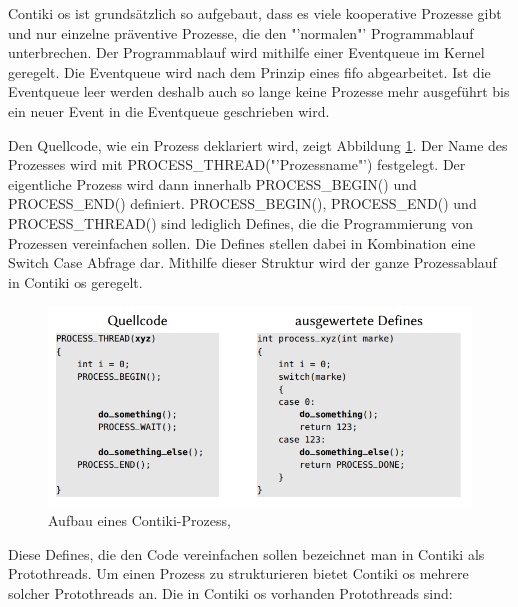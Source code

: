 	Contiki \ac{os} ist grundsätzlich so aufgebaut, dass es viele kooperative Prozesse gibt und nur einzelne präventive Prozesse, die den "'normalen"' Programmablauf unterbrechen. Der Programmablauf wird mithilfe einer Eventqueue im Kernel geregelt. Die Eventqueue wird nach dem Prinzip eines \ac{fifo} abgearbeitet. Ist die Eventqueue leer werden deshalb auch so lange keine Prozesse mehr ausgeführt bis ein neuer Event in die Eventqueue geschrieben wird.
	
	Den Quellcode, wie ein Prozess deklariert wird, zeigt Abbildung \ref{ContikiProzess}. Der Name des Prozesses wird mit PROCESS\_THREAD("'Prozessname"') festgelegt. Der eigentliche Prozess wird dann innerhalb PROCESS\_BEGIN() und PROCESS\_END() definiert. PROCESS\_BEGIN(), PROCESS\_END() und PROCESS\_THREAD() sind lediglich Defines, die die Programmierung von Prozessen vereinfachen sollen. Die Defines stellen dabei in Kombination eine Switch Case Abfrage dar. Mithilfe dieser Struktur wird der ganze Prozessablauf in Contiki \ac{os} geregelt.
	\begin{figure}
		\centering
		\includegraphics[scale=0.5]{Grafiken-Julian/Contiki_Prozess.png}
		\caption{Aufbau eines Contiki-Prozess, \cite[S.9]{ausgewertetedefines}}
		\label{ContikiProzess}
	\end{figure}
	Diese Defines, die den Code vereinfachen sollen bezeichnet man in Contiki als Protothreads. Um einen Prozess zu strukturieren bietet Contiki \ac{os} mehrere solcher Protothreads an. Die in Contiki \ac{os} vorhanden Protothreads sind:
	
